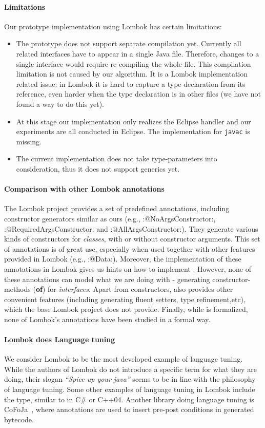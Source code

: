 \paragraph{Limitations}
Our prototype implementation using Lombok has certain limitations:
\begin{itemize}
\item The prototype does not support separate compilation yet. Currently all
  related interfaces have to appear in a single Java file. Therefore, changes to
  a single interface would require re-compiling the whole file. This compilation
  limitation is not caused by our algorithm. It is a Lombok implementation related
  issue: in Lombok it is hard to capture a type declaration from its reference,
  even harder when the type declaration is in other files (we have not found a
  way to do this yet).
\item At this stage our implementation only realizes the Eclipse handler and our
  experiments are all conducted in Eclipse. The implementation for
  \texttt{javac} is missing.
\item The current implementation does not take type-parameters into
  consideration, thus it does not support generics yet.
\end{itemize}

\paragraph{Comparison with other Lombok annotations}
The Lombok project provides a set of predefined annotations, including constructor
generators similar as ours (e.g., \Q:@NoArgsConstructor:,
\Q:@RequiredArgsConstructor: and \Q:@AllArgsConstructor:). They
generate various kinds of constructors for \emph{classes}, with or without
constructor arguments. This set of annotations is of great use, especially when
used together with other features provided in Lombok (e.g.,
\Q:@Data:). Moreover, the implementation of these annotations in Lombok
gives us hints on how to implement \mixin. However, none of these annotations
can model what we are doing with \mixin - generating constructor-methods
(\textbf{of}) for \emph{interfaces}. Apart from constructors, \mixin also
provides other convenient features (including generating fluent setters, type
refinement,etc), which the base Lombok project does not provide.
Finally, while \mixin is formalized, none of Lombok's annotations have been
studied in a formal way.

\paragraph{Lombok does Language tuning}
We consider Lombok to be the most developed example of language
tuning.  While the authors of Lombok do not introduce a specific term
for what they are doing, their slogan \emph{``Spice up your java''}
seems to be in line with the philosophy of language tuning. Some
other examples of language tuning in Lombok include the \Q@val@ type,
similar to \Q@auto@ in C\# or C++04.  Another library doing language
tuning is CoFoJa~\cite{cofoja}, where annotations are used to insert
pre-post conditions in generated bytecode.


